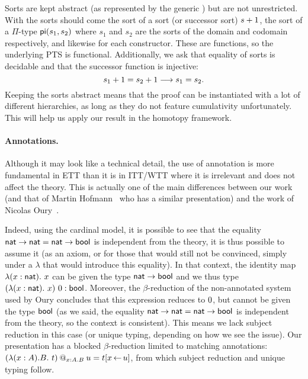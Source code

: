 Sorts are kept abstract (as represented by the generic \cS) but are not
unrestricted. With the sorts should come the sort of a sort (or successor
sort) \(s+1\), the sort of a \(\Pi\)-type \(\mathsf{pi}(s_1,s_2)\)
where \(s_1\) and \(s_2\) are the sorts of the domain and codomain respectively,
and likewise for each constructor.
These are functions, so the underlying \acrshort{PTS} is functional.
Additionally, we ask that equality of sorts is decidable and that the successor
function is injective:
\[
  s_1+1 = s_2+1 \longrightarrow s_1 = s_2.
\]
Keeping the sorts abstract means that the proof can be instantiated with a lot
of different hierarchies, as long as they do not feature cumulativity
unfortunately. This will help us apply our result in the homotopy framework.

\paragraph{Annotations.}

Although it may look like a technical detail, the use of annotation is more
fundamental in \acrshort{ETT} than it is in \acrshort{ITT}/\acrshort{WTT}
where it is irrelevant and does not affect the theory.
This is actually one of the main differences between our work
(and that of Martin Hofmann~ who has a
similar presentation) and the work of Nicolas
Oury~.

Indeed, using the cardinal model, it is possible to see that the equality
$\mathsf{nat} \to \mathsf{nat} = \mathsf{nat} \to \mathsf{bool}$ is independent from the theory, it is
thus possible to assume it (as an axiom, or for those that would still
not be convinced, simply under a $\lambda$ that would introduce this
equality).  In that context, the identity map $\lambda(x : \mathsf{nat}).\ x$
can be given the type $\mathsf{nat} \to \mathsf{bool}$ and we thus type
$(\lambda(x : \mathsf{nat}).\ x)\ 0 : \mathsf{bool}$.  Moreover, the
$\beta$-reduction of the non-annotated system used by Oury concludes
that this expression reduces to $0$, but cannot be given the type
$\mathsf{bool}$ (as we said, the equality $\mathsf{nat} \to \mathsf{nat} = \mathsf{nat} \to \mathsf{bool}$ is
independent from the theory, so the context is consistent). This means
we lack subject reduction in this case (or unique typing,
depending on how we see the issue).  Our presentation has a blocked
$\beta$-reduction limited to matching annotations:
$(\lambda (x:A). B .\ t)\mathbin{@_{x:A.B}} u = t[x \mathop{\leftarrow} u]$, from which subject
reduction and unique typing follow.

